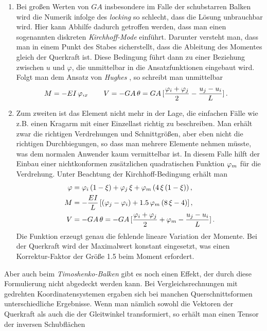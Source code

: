 \begin{enumerate}
\item Bei gro{\ss}en Werten von $GA$ insbesondere im Falle der schubstarren Balken wird die Numerik infolge des {\em locking\/} so schlecht, dass die L\"{o}sung unbrauchbar wird. Hier kann Abhilfe dadurch getroffen werden, dass man einen sogenannten diskreten {\em Kirchhoff-Mode\/} einf\"{u}hrt. Darunter versteht man, dass man in einem Punkt des Stabes sicherstellt, dass die Ableitung des Momentes gleich der Querkraft ist. Diese Bedingung f\"{u}hrt dann zu einer Beziehung zwischen $u$ und $\varphi$, die unmittelbar in die Ansatzfunktionen eingebaut wird. Folgt man dem Ansatz von {\em Hughes\/} \cite{Hughes}, so schreibt man unmittelbar
\begin{align}
M &= - EI\,\varphi,_x  \qquad
V = - GA\,\theta = GA\,[\frac{\varphi_i + \varphi_j}{2} - \frac{u_j - u_i}{L}]\,.
\end{align}
\item Zum zweiten ist das Element nicht mehr in der Lage, die einfachen F\"{a}lle wie z.B. einen Kragarm mit einer Einzellast richtig zu beschreiben. Man erh\"{a}lt zwar die richtigen Verdrehungen und Schnittgr\"{o}{\ss}en, aber eben nicht die richtigen Durchbiegungen, so dass man mehrere Elemente nehmen m\"{u}sste, was dem normalen Anwender kaum vermittelbar ist. In diesem Falle hilft der Einbau einer nichtkonformen zus\"{a}tzlichen quadratischen Funktion $\varphi_m$ f\"{u}r die Verdrehung. Unter Beachtung der Kirchhoff-Bedingung erh\"{a}lt man
\begin{subequations}
\begin{align}
\varphi &= \varphi_i \,(1 - \xi) + \varphi_j\,\xi + \varphi_m\,(4\,\xi\,(1-\xi))\,,\\
M &= - \frac{EI}{L}\, [(\varphi_j - \varphi_i) + 1.5\,\varphi_m\,(8\,\xi - 4)]\,, \\
V &= - GA\,\theta = - GA\,[\frac{\varphi_i + \varphi_j}{2} + \varphi_m - \frac{u_j - u_i}{L}]\,.
\end{align}
\end{subequations}
Die Funktion erzeugt genau die fehlende lineare Variation der Momente. Bei der Querkraft wird der Maximalwert konstant eingesetzt, was einen Korrektur-Faktor der Gr\"{o}{\ss}e 1.5 beim Moment erfordert.
\end{enumerate}
Aber auch beim {\em Timoshenko-Balken\/} gibt es noch einen Effekt, der durch diese Formulierung nicht abgedeckt werden kann. Bei Vergleichsrechnungen mit gedrehten Koordinatensystemen ergaben sich bei manchen Querschnittsformen unterschiedliche Ergebnisse. Wenn man n\"{a}mlich sowohl die Vektoren der Querkraft als auch die der Gleitwinkel transformiert, so erh\"{a}lt man einen Tensor der inversen Schubfl\"{a}chen
